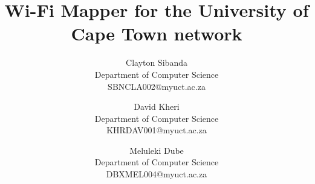 \documentclass[11pt,a4paper]{article}
\begin{document}
\title{Wi-Fi Mapper for the University of Cape Town network} \date{}
\author{Clayton Sibanda\\Department of Computer Science\\SBNCLA002@myuct.ac.za
\and David Kheri\\Department of Computer Science\\KHRDAV001@myuct.ac.za
\and Meluleki Dube\\Department of Computer Science\\DBXMEL004@myuct.ac.za}

\chead{}
\lfoot{}
\cfoot{\thepage}    %
\rfoot{}
\renewcommand{\headrulewidth}{0.0pt}   %
\maketitle
\thispagestyle{plain}  %







\end{document}
